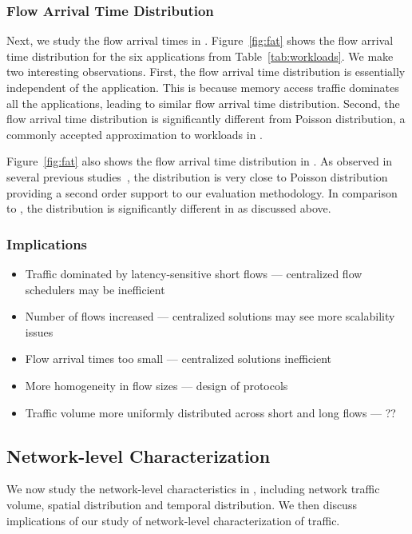 \subsubsection{Flow Arrival Time Distribution}
\label{ssec:fatd}
Next, we study the flow arrival times in \dis. Figure~\ref{fig:fat} shows the flow arrival time distribution for the six applications from Table~\ref{tab:workloads}. We make two interesting observations. First, the flow arrival time distribution is essentially independent of the application. This is because memory access traffic dominates all the applications, leading to similar flow arrival time distribution. Second, the flow arrival time distribution is significantly different from Poisson distribution, a commonly accepted approximation to workloads in \pdis. 

Figure~\ref{fig:fat} also shows the flow arrival time distribution in \pdis. As observed in several previous studies~\cite{imc-srikanth, imc-theo}, the distribution is very close to Poisson distribution providing a second order support to our evaluation methodology. In comparison to \pdis, the distribution is significantly different in \dis as discussed above.

\subsubsection{Implications}
\begin{itemize}[leftmargin=*]
	\itemsep0em
	\item Traffic dominated by latency-sensitive short flows --- centralized flow schedulers may be inefficient
	\item Number of flows increased --- centralized solutions may see more scalability issues
	\item {} Flow arrival times too small --- centralized solutions inefficient
	\item More homogeneity in flow sizes --- design of protocols
	\item {} Traffic volume more uniformly distributed across short and long flows --- ??
\end{itemize}

\subsection{Network-level Characterization} 
\label{ssec:nlc}
We now study the network-level characteristics in \dis, including network traffic volume, spatial distribution and temporal distribution. We then discuss implications of our study of network-level characterization of \dis traffic.

